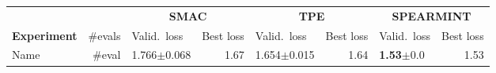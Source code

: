 \documentclass[landscape]{article} %
\begin{document}
\begin{table}[t]
\begin{tabularx}{\textwidth}{lr|Xr|Xr|Xr}
\toprule
\multicolumn{2}{l}{}&\multicolumn{2}{c}{\bf SMAC}&\multicolumn{2}{c}{\bf TPE}&\multicolumn{2}{c}{\bf SPEARMINT}\\
\multicolumn{1}{l}{\bf Experiment} &\multicolumn{1}{r}{\#evals}&\multicolumn{1}{l}{Valid.\ loss} &\multicolumn{1}{r}{Best loss}&\multicolumn{1}{l}{Valid.\ loss} &\multicolumn{1}{r}{Best loss}&\multicolumn{1}{l}{Valid.\ loss} &\multicolumn{1}{r}{Best loss}\\
\toprule
Name & \#eval & 1.766$\pm$0.068 & 1.67 & 1.654$\pm$0.015 & 1.64 & \textbf{1.53}$\pm$0.0 & 1.53 \\
\bottomrule
\end{tabularx}
\end{table}
\end{document}
